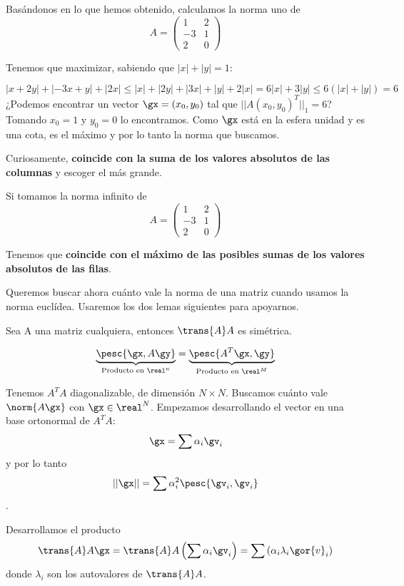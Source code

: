 \documentclass{apuntes}
\begin{document}
Basándonos en lo que hemos obtenido, calculamos la norma uno de 
\[A = \begin{pmatrix}
      1&2\\-3&1\\2&0
     \end{pmatrix}\]  

Tenemos que maximizar, sabiendo que $|x|+|y| = 1$:

\[ |x+2y| + |-3x+y| + |2x| \leq |x|+|2y| + |3x| + |y| + 2|x| = 6|x|+3|y| \leq 6 (|x|+|y|) =6 \]
¿Podemos encontrar un vector $\gx = (x_0,y_0)$ tal que $||A(x_0,y_0)^T||_1 = 6$?\\
Tomando $x_0 = 1$ y $y_0 = 0$ lo encontramos. Como $\gx$ está en la esfera unidad y es una cota, es el máximo y por lo tanto la norma que buscamos.

Curiosamente, \textbf{coincide con la suma de los valores absolutos de las columnas} y escoger el más grande.

Si tomamos la norma infinito de 
\[A = \begin{pmatrix}
      1&2\\-3&1\\2&0
     \end{pmatrix}\]

Tenemos que \textbf{coincide con el máximo de las posibles sumas de los valores absolutos de las filas}.



Queremos buscar ahora cuánto vale la norma de una matriz cuando usamos la norma euclídea. Usaremos los dos lemas siguientes para apoyarnos.

\begin{lemma}
 Sea A una matriz cualquiera, entonces $\trans{A}A$ es simétrica.
\end{lemma}
\begin{lemma}
 \[ \underbrace{\pesc{\gx,A\gy}}_{\text{Producto en } \real^n} = \underbrace{\pesc{A^T \gx,\gy}}_{\text{Producto en } \real^M} \]
\end{lemma}

Tenemos $A^TA$ diagonalizable, de dimensión $N \times N$. Buscamos cuánto vale $\norm{A\gx}$ con  $\gx \in \real^N$. Empezamos desarrollando el vector en una base ortonormal de  $A^T A$: \[ \gx = \sum \alpha_i \gv_i \] y por lo tanto \[ ||\gx|| = \sum \alpha_i^2 \pesc{\gv_i,\gv_i}\].
 
 Desarrollamos el producto \[\trans{A}A\gx = \trans{A}A\left(\sum \alpha_i \gv_i\right) = \sum \left(\alpha_i\lambda_i\gor{v}_i\right) \] donde $\lambda_i$ son los autovalores de $\trans{A}A$. 
 
\end{document}

